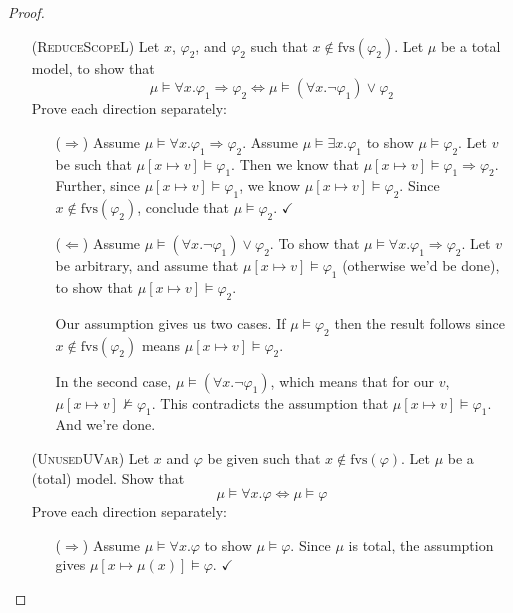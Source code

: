 \documentclass{article}
\newcommand{\fvs}{\textrm{fvs}}
\theoremstyle{plain}
\theoremstyle{definition}
\theoremstyle{remark}
\begin{document}
\begin{proof}
\begin{enumerate}[align=left]
    \item[(\textsc{ReduceScopeL})]
    Let $x$, $\varphi_{2}$, and $\varphi_2$ such that $x \not \in \fvs(\varphi_{2})$.
    Let $\mu$ be a total model, to show that
    \[\mu \models \forall x. \varphi_{1} \Rightarrow \varphi_{2}
      \iff
      \mu \models (\forall x. \neg \varphi_{1}) \vee \varphi_{2}
    \]
    Prove each direction separately:
    \begin{enumerate}[align=left]
      \item[($\Rightarrow$)]
      Assume $\mu \models \forall x. \varphi_{1} \Rightarrow \varphi_{2}$.
      Assume $\mu \models \exists x. \varphi_{1}$ to show $\mu \models \varphi_{2}$.
      Let $v$ be such that $\mu[x \mapsto v] \models \varphi_{1}$.
      Then we know that $\mu[x \mapsto v] \models \varphi_{1} \Rightarrow \varphi_{2}$.
      Further, since $\mu[x \mapsto v] \models \varphi_{1}$, we know $\mu[x \mapsto v] \models \varphi_{2}$. Since $x \not \in \fvs(\varphi_{2})$, conclude that $\mu \models \varphi_{2}$.
      \hfill $\checkmark$

      \item[($\Leftarrow$)]
      Assume $\mu \models (\forall x. \neg \varphi_{1}) \vee \varphi_{2}$. To show that $\mu \models \forall x. \varphi_{1} \Rightarrow \varphi_{2}$. Let $v$ be arbitrary, and assume that $\mu[x \mapsto v] \models \varphi_{1}$ (otherwise we'd be done), to show that $\mu[x \mapsto v] \models \varphi_{2}$.

      Our assumption gives us two cases. If $\mu \models \varphi_{2}$ then the result follows since $x \not \in \fvs(\varphi_{2})$ means $\mu[x \mapsto v] \models \varphi_{2}$.

      In the second case, $\mu \models (\forall x. \neg \varphi_{1})$, which means that for our $v$,
      $\mu[x \mapsto v] \not\models \varphi_{1}$. This contradicts the assumption that $\mu[x \mapsto v] \models \varphi_{1}$. And we're done.

    \end{enumerate}

    \item[(\textsc{UnusedUVar})] Let $x$ and $\varphi$ be given such that
    $x \not \in \fvs(\varphi)$. Let $\mu$ be a (total) model. Show that
    \[\mu \models \forall x. \varphi \iff \mu \models \varphi\]
    Prove each direction separately:
    \begin{enumerate}[align=left]
      \item[($\Rightarrow$)] Assume $\mu \models \forall x. \varphi$ to show
      $\mu \models \varphi$. Since $\mu$ is total, the assumption gives $\mu[x\mapsto \mu(x)] \models \varphi$. \hfill $\checkmark$


\end{enumerate}
\end{enumerate}
\end{proof}
\end{document}

